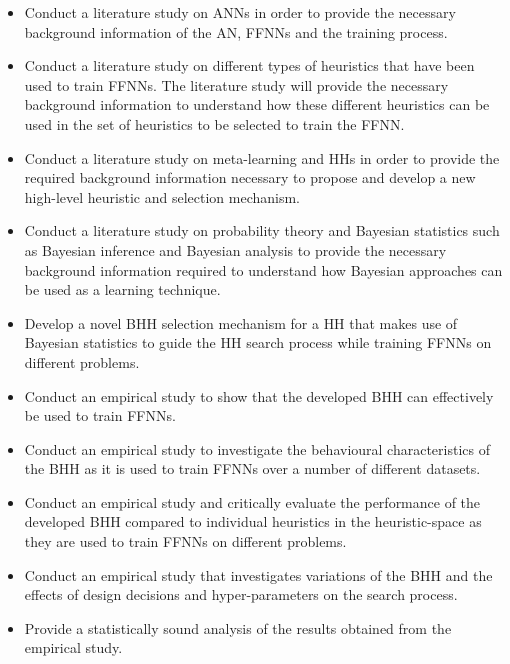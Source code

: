 \begin{itemize}
      \item Conduct a literature study on \acp{ANN} in order to provide the necessary background information of the \ac{AN}, \acp{FFNN} and the training process.

      \item Conduct a literature study on different types of heuristics that have been used to train \acp{FFNN}. The literature study will provide the necessary background information to understand how these different heuristics can be used in the set of heuristics to be selected to train the \ac{FFNN}.

      \item Conduct a literature study on meta-learning and \acp{HH} in order to provide the required background information necessary to propose and develop a new high-level heuristic and selection mechanism.

      \item Conduct a literature study on probability theory and Bayesian statistics such as Bayesian inference and Bayesian analysis to provide the necessary background information required to understand how Bayesian approaches can be used as a learning technique.

      \item Develop a novel \Ac{BHH} selection mechanism for a \ac{HH} that makes use of Bayesian statistics to guide the \ac{HH} search process while training \acp{FFNN} on different problems.

      \item Conduct an empirical study to show that the developed \Ac{BHH} can effectively be used to train \acp{FFNN}.

      \item Conduct an empirical study to investigate the behavioural characteristics of the \ac{BHH} as it is used to train \acp{FFNN} over a number of different datasets.

      \item Conduct an empirical study and critically evaluate the performance of the developed \Ac{BHH} compared to individual heuristics in the heuristic-space as they are used to train \acp{FFNN} on different problems.

      \item Conduct an empirical study that investigates variations of the \Ac{BHH} and the effects of design decisions and hyper-parameters on the search process.

      \item Provide a statistically sound analysis of the results obtained from the empirical study.
\end{itemize}

